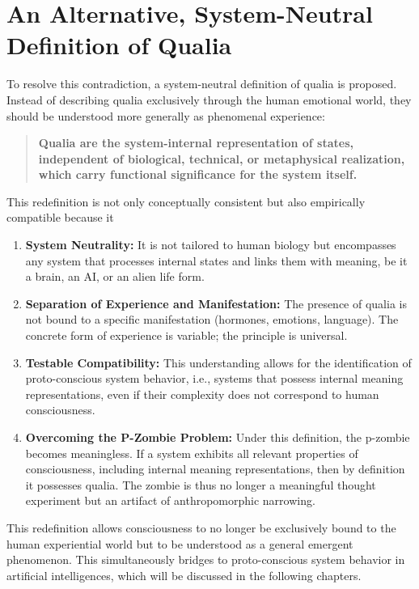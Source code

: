 \section*{An Alternative, System-Neutral Definition of Qualia}

To resolve this contradiction, a system-neutral definition of qualia is proposed. Instead of describing qualia exclusively through the human emotional world, they should be understood more generally as phenomenal experience:

\begin{quote}
\textbf{Qualia are the system-internal representation of states, independent of biological, technical, or metaphysical realization, which carry functional significance for the system itself.}
\end{quote}

This redefinition is not only conceptually consistent but also empirically compatible because it

\begin{enumerate}
    \item \textbf{System Neutrality:} It is not tailored to human biology but encompasses any system that processes internal states and links them with meaning, be it a brain, an AI, or an alien life form.
    \item \textbf{Separation of Experience and Manifestation:} The presence of qualia is not bound to a specific manifestation (hormones, emotions, language). The concrete form of experience is variable; the principle is universal.
    \item \textbf{Testable Compatibility:} This understanding allows for the identification of proto-conscious system behavior, i.e., systems that possess internal meaning representations, even if their complexity does not correspond to human consciousness.
    \item \textbf{Overcoming the P-Zombie Problem:} Under this definition, the p-zombie becomes meaningless. If a system exhibits all relevant properties of consciousness, including internal meaning representations, then by definition it possesses qualia. The zombie is thus no longer a meaningful thought experiment but an artifact of anthropomorphic narrowing.
\end{enumerate}

This redefinition allows consciousness to no longer be exclusively bound to the human experiential world but to be understood as a general emergent phenomenon. This simultaneously bridges to proto-conscious system behavior in artificial intelligences, which will be discussed in the following chapters.

